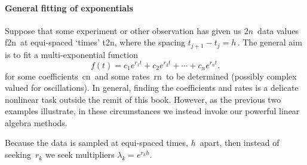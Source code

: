 \paragraph{General fitting of exponentials}
Suppose that some experiment or other observation has given us \(2n\)~data values \hlist f{2n}\ at equi-spaced `times' \hlist t{2n}, where the spacing \(t_{j+1}-t_j=h\)\,.
The general aim is to fit a multi-exponential function \cite[\S2.6, e.g.]{Cuyt2015}
\begin{equation}
f(t)=c_1e^{r_1t}+c_2e^{r_2t}+\cdots+c_ne^{r_nt}.
\label{eq:eiddse}
\end{equation}
for some coefficients~\hlist cn\ and some rates~\hlist rn\ to be determined (possibly complex valued for oscillations).
In general, finding the coefficients and rates is a delicate nonlinear task outside the remit of this book.
However, as the previous two examples illustrate, in these circumstances we instead invoke our powerful linear algebra methods.

Because the data is sampled at equi-spaced times, \(h\)~apart, then instead of seeking~\(r_k\) we seek multipliers \(\lambda_k=e^{r_kh}\).

